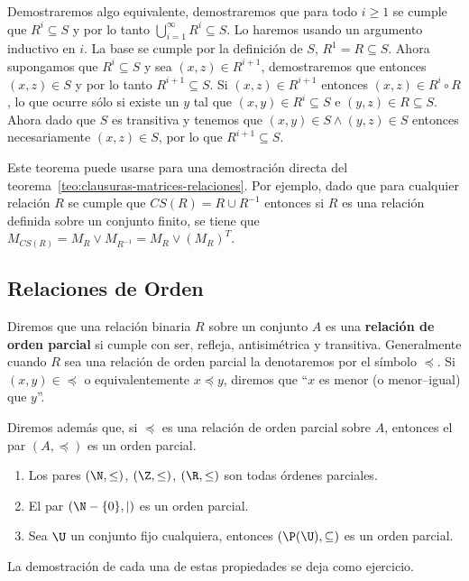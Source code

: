 \begin{teorema}
\begin{demostracion}
\begin{enumerate}
\begin{itemize}
    Demostraremos algo equivalente, demostraremos que para todo $i\geq 1$ se cumple que $R^i\subseteq S$ y por lo tanto $\bigcup_{i=1}^{\infty}R^{i}\subseteq S$.
    Lo haremos usando un argumento inductivo en $i$.
    La base se cumple por la definición de $S$, $R^1=R\subseteq S$.
    Ahora supongamos que $R^i\subseteq S$ y sea $(x,z)\in R^{i+1}$, demostraremos que entonces $(x,z)\in S$ y por lo tanto $R^{i+1}\subseteq S$.
    Si $(x,z)\in R^{i+1}$ entonces $(x,z)\in R^i\circ R$, lo que ocurre sólo si existe un $y$ tal que $(x,y)\in R^i\subseteq S$ e $(y,z)\in R\subseteq S$.
    Ahora dado que $S$ es transitiva y tenemos que $(x,y)\in S\wedge(y,z)\in S$ entonces necesariamente $(x,z)\in S$, por lo que $R^{i+1}\subseteq S$.
  \end{itemize}
\end{enumerate}
\end{demostracion}

Este teorema puede usarse para una demostración directa del teorema~\ref{teo:clausuras-matrices-relaciones}.
Por ejemplo, dado que para cualquier relación $R$ se cumple que $CS(R)=R\cup R^{-1}$ entonces si $R$ es una relación definida sobre un conjunto finito, se tiene que $M_{CS(R)}=M_R\vee M_{R^{-1}}=M_R\vee (M_R)^T$.
\end{teorema}

\subsection{Relaciones de Orden}

\begin{definicion}
Diremos que una relación binaria $R$ sobre un conjunto $A$ es una {\bf relación de orden parcial} si cumple con ser, refleja, antisimétrica y transitiva.
Generalmente cuando $R$ sea una relación de orden parcial la denotaremos por el símbolo $\preceq$.
Si $(x,y)\in\preceq$ o equivalentemente $x\preceq y$, diremos que ``$x$ es menor (o menor--igual) que $y$''.

Diremos además que, si $\preceq$ es una relación de orden parcial sobre $A$, entonces el par $(A,\preceq)$ es un orden parcial.
\end{definicion}

\begin{ejemplo}
\begin{enumerate}
  \itemsep 0pt
	\item Los pares $(\N,\leq)$, $(\Z,\leq)$, $(\R,\leq)$ son todas órdenes parciales.
  \item El par $(\N-\{0\},|)$ es un orden parcial.
  \item Sea $\U$ un conjunto fijo cualquiera, entonces $(\P(\U),\subseteq)$ es un orden parcial.
\end{enumerate}
La demostración de cada una de estas propiedades se deja como ejercicio.
\end{ejemplo}

